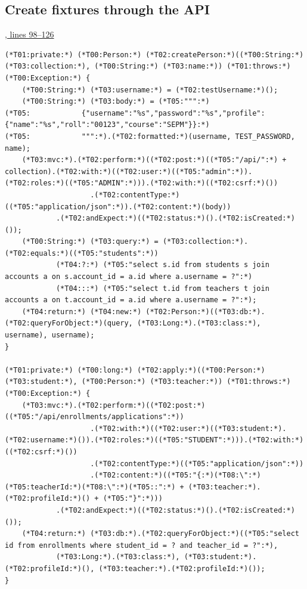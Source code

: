 \subsection{Create fixtures through the API}
\par\smallskip
{\small\href{\repo/blob/5d22aed7f6d4ef1e4c0b0c0dabf2962ba4b47608/src/test/java/com/example/fmschool/EnrollmentPersistenceIT.java#L98-L126}{, lines 98--126}}
\begin{lstlisting}[style=vsJava,firstnumber=98]
(*T01:private:*) (*T00:Person:*) (*T02:createPerson:*)((*T00:String:*) (*T03:collection:*), (*T00:String:*) (*T03:name:*)) (*T01:throws:*) (*T00:Exception:*) {
    (*T00:String:*) (*T03:username:*) = (*T02:testUsername:*)();
    (*T00:String:*) (*T03:body:*) = (*T05:""":*)
(*T05:            {"username":"%s","password":"%s","profile":{"name":"%s","roll":"00123","course":"SEPM"}}:*)
(*T05:            """:*).(*T02:formatted:*)(username, TEST_PASSWORD, name);
    (*T03:mvc:*).(*T02:perform:*)((*T02:post:*)((*T05:"/api/":*) + collection).(*T02:with:*)((*T02:user:*)((*T05:"admin":*)).(*T02:roles:*)((*T05:"ADMIN":*))).(*T02:with:*)((*T02:csrf:*)())
                    .(*T02:contentType:*)((*T05:"application/json":*)).(*T02:content:*)(body))
            .(*T02:andExpect:*)((*T02:status:*)().(*T02:isCreated:*)());
    (*T00:String:*) (*T03:query:*) = (*T03:collection:*).(*T02:equals:*)((*T05:"students":*))
            (*T04:?:*) (*T05:"select s.id from students s join accounts a on s.account_id = a.id where a.username = ?":*)
            (*T04:::*) (*T05:"select t.id from teachers t join accounts a on t.account_id = a.id where a.username = ?":*);
    (*T04:return:*) (*T04:new:*) (*T02:Person:*)((*T03:db:*).(*T02:queryForObject:*)(query, (*T03:Long:*).(*T03:class:*), username), username);
}

(*T01:private:*) (*T00:long:*) (*T02:apply:*)((*T00:Person:*) (*T03:student:*), (*T00:Person:*) (*T03:teacher:*)) (*T01:throws:*) (*T00:Exception:*) {
    (*T03:mvc:*).(*T02:perform:*)((*T02:post:*)((*T05:"/api/enrollments/applications":*))
                    .(*T02:with:*)((*T02:user:*)((*T03:student:*).(*T02:username:*)()).(*T02:roles:*)((*T05:"STUDENT":*))).(*T02:with:*)((*T02:csrf:*)())
                    .(*T02:contentType:*)((*T05:"application/json":*))
                    .(*T02:content:*)((*T05:"{:*)(*T08:\":*)(*T05:teacherId:*)(*T08:\":*)(*T05::":*) + (*T03:teacher:*).(*T02:profileId:*)() + (*T05:"}":*)))
            .(*T02:andExpect:*)((*T02:status:*)().(*T02:isCreated:*)());
    (*T04:return:*) (*T03:db:*).(*T02:queryForObject:*)((*T05:"select id from enrollments where student_id = ? and teacher_id = ?":*),
            (*T03:Long:*).(*T03:class:*), (*T03:student:*).(*T02:profileId:*)(), (*T03:teacher:*).(*T02:profileId:*)());
}


\end{lstlisting}
